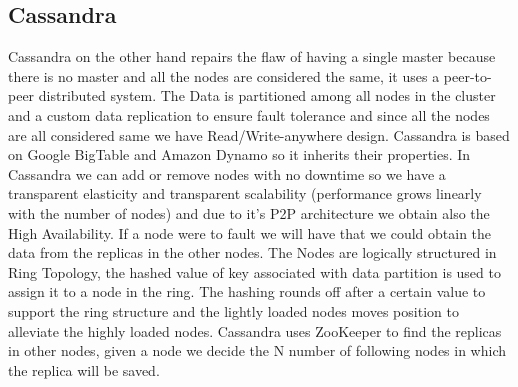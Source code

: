 \documentclass[a4page, 11pt]{article}
\begin{document}
\subsection{Cassandra}
Cassandra on the other hand repairs the flaw of having a single master because there is no master and all the nodes are considered the same, it uses a peer-to-peer distributed system. 
The Data is partitioned among all nodes in the cluster and a custom data replication to ensure fault tolerance and since all the nodes are all considered same we have Read/Write-anywhere design.
Cassandra is based on Google BigTable and Amazon Dynamo so it inherits their properties.
\newline
In Cassandra we can add or remove nodes with no downtime so we have a transparent elasticity and transparent scalability (performance grows linearly with the number of nodes) and due to it's P2P architecture we obtain also the High Availability. If a node were to fault we will have that we could obtain the data from the replicas in the other nodes.
The Nodes are logically structured in Ring Topology, the hashed value of key associated with data partition is used to assign it to a node in the ring. The hashing rounds off after a certain value to support the ring structure and the lightly loaded nodes moves position to alleviate the highly loaded nodes.
Cassandra uses ZooKeeper to find the replicas in other nodes, given a node we decide the N number of following nodes in which the replica will be saved.
\end{document}
